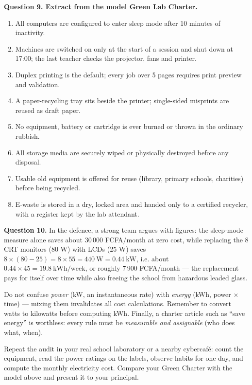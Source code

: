 \documentclass[11pt]{article}
\begin{document}
\textbf{Question 9. Extract from the model Green Lab Charter.}
\begin{enumerate}
\item All computers are configured to enter sleep mode after 10 minutes of inactivity.
\item Machines are switched on only at the start of a session and shut down at 17:00; the last teacher checks the projector, fans and printer.
\item Duplex printing is the default; every job over 5 pages requires print preview and validation.
\item A paper-recycling tray sits beside the printer; single-sided misprints are reused as draft paper.
\item No equipment, battery or cartridge is ever burned or thrown in the ordinary rubbish.
\item All storage media are securely wiped or physically destroyed before any disposal.
\item Usable old equipment is offered for reuse (library, primary schools, charities) before being recycled.
\item E-waste is stored in a dry, locked area and handed only to a certified recycler, with a register kept by the lab attendant.
\end{enumerate}

\textbf{Question 10.} In the defence, a strong team argues with figures: the sleep-mode measure alone saves about 30\,000 FCFA/month at zero cost, while replacing the 8 CRT monitors (80 W) with LCDs (25 W) saves $8 \times (80 - 25) = 8 \times 55 = 440\ \text{W} = 0.44\ \text{kW}$, i.e. about $0.44 \times 45 = 19.8\ \text{kWh/week}$, or roughly 7\,900 FCFA/month --- the replacement pays for itself over time while also freeing the school from hazardous leaded glass.

\begin{attention}
Do not confuse \emph{power} (kW, an instantaneous rate) with \emph{energy} (kWh, power $\times$ time) --- mixing them invalidates all cost calculations. Remember to convert watts to kilowatts before computing kWh. Finally, a charter article such as ``save energy'' is worthless: every rule must be \emph{measurable and assignable} (who does what, when).
\end{attention}

\begin{exercice}
Repeat the audit in your real school laboratory or a nearby cybercafé: count the equipment, read the power ratings on the labels, observe habits for one day, and compute the monthly electricity cost. Compare your Green Charter with the model above and present it to your principal.
\end{exercice}
\end{document}
